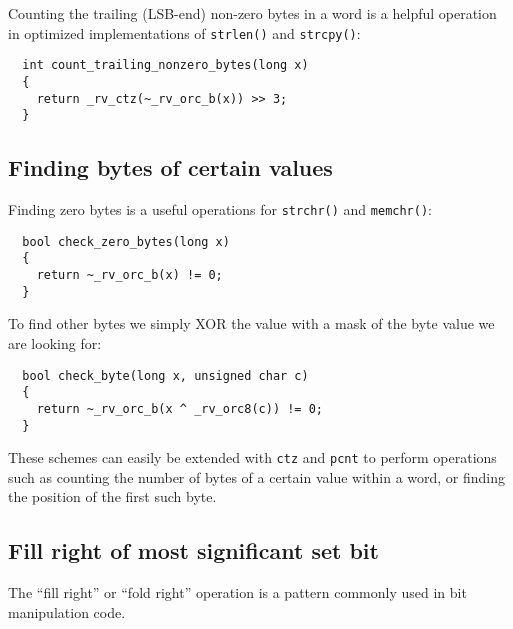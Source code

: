 Counting the trailing (LSB-end) non-zero bytes in a word
is a helpful operation in optimized implementations of {\tt strlen()}
and {\tt strcpy()}:

\begin{minipage}{\linewidth}
\begin{verbatim}
  int count_trailing_nonzero_bytes(long x)
  {
    return _rv_ctz(~_rv_orc_b(x)) >> 3;
  }
\end{verbatim}
\end{minipage}


\subsection{Finding bytes of certain values}

Finding zero bytes is a useful operations for {\tt strchr()}
and {\tt memchr()}:

\begin{minipage}{\linewidth}
\begin{verbatim}
  bool check_zero_bytes(long x)
  {
    return ~_rv_orc_b(x) != 0;
  }
\end{verbatim}
\end{minipage}

To find other bytes we simply XOR the value with a mask of the byte value we
are looking for:

\begin{minipage}{\linewidth}
\begin{verbatim}
  bool check_byte(long x, unsigned char c)
  {
    return ~_rv_orc_b(x ^ _rv_orc8(c)) != 0;
  }
\end{verbatim}
\end{minipage}

These schemes can easily be extended with {\tt ctz} and {\tt pcnt} to perform
operations such as counting the number of bytes of a certain value within a
word, or finding the position of the first such byte.


\subsection{Fill right of most significant set bit}

The ``fill right'' or ``fold right'' operation is a pattern commonly used in bit manipulation code.~\cite{MAGIC}

